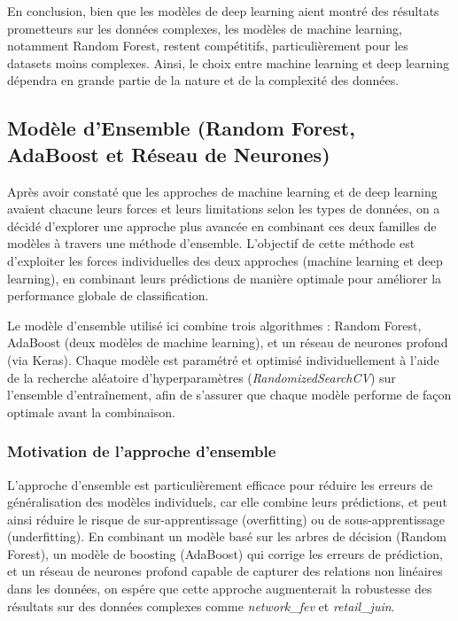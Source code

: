 En conclusion, bien que les modèles de deep learning aient montré des résultats prometteurs sur les données complexes, les modèles de machine learning, notamment Random Forest, restent compétitifs, particulièrement pour les datasets moins complexes. Ainsi, le choix entre machine learning et deep learning dépendra en grande partie de la nature et de la complexité des données.

\subsection{Modèle d’Ensemble (Random Forest, AdaBoost et Réseau de Neurones)}

Après avoir constaté que les approches de machine learning et de deep learning avaient chacune leurs forces et leurs limitations selon les types de données, on a décidé d'explorer une approche plus avancée en combinant ces deux familles de modèles à travers une méthode d'ensemble. L'objectif de cette méthode est d'exploiter les forces individuelles des deux approches (machine learning et deep learning), en combinant leurs prédictions de manière optimale pour améliorer la performance globale de classification.

Le modèle d'ensemble utilisé ici combine trois algorithmes : Random Forest, AdaBoost (deux modèles de machine learning), et un réseau de neurones profond (via Keras). Chaque modèle est paramétré et optimisé individuellement à l'aide de la recherche aléatoire d'hyperparamètres (\textit{RandomizedSearchCV}) sur l'ensemble d'entraînement, afin de s'assurer que chaque modèle performe de façon optimale avant la combinaison.

\subsubsection{Motivation de l’approche d’ensemble}

L'approche d'ensemble est particulièrement efficace pour réduire les erreurs de généralisation des modèles individuels, car elle combine leurs prédictions, et peut ainsi réduire le risque de sur-apprentissage (overfitting) ou de sous-apprentissage (underfitting). En combinant un modèle basé sur les arbres de décision (Random Forest), un modèle de boosting (AdaBoost) qui corrige les erreurs de prédiction, et un réseau de neurones profond capable de capturer des relations non linéaires dans les données, on espére que cette approche augmenterait la robustesse des résultats sur des données complexes comme \textit{network\_fev} et \textit{retail\_juin}.

